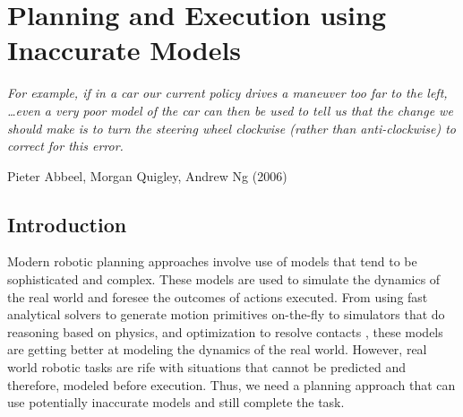 \chapter{Planning and Execution using Inaccurate Models}
\label{cha:plann-exec}

\epigraph{\textit{For example, if in a car our current policy drives a
    maneuver too far to the left, \ldots even a very poor model of the
    car can then be used to tell us that 
    the change we should make is to turn the steering wheel clockwise
    (rather than anti-clockwise) to correct for this error.}}{Pieter
  Abbeel, Morgan Quigley, Andrew Ng (2006)}

\section{Introduction}
\label{sec:introduction}

Modern robotic planning approaches involve use of models that tend to
be sophisticated and complex. These models are used to simulate the
dynamics of the real world and foresee the outcomes of actions
executed. From using fast analytical solvers to generate motion
primitives on-the-fly \cite{DBLP:conf/icra/CohenSCL11} to 
simulators that do reasoning based on physics, and optimization to resolve
contacts \cite{DBLP:conf/iros/TodorovET12}, these models are getting better at
modeling the dynamics of the real world. However, real world robotic
tasks are rife with situations that cannot be predicted and therefore,
modeled before execution. Thus, we need a
planning approach that can use potentially inaccurate models and still
complete the task.

